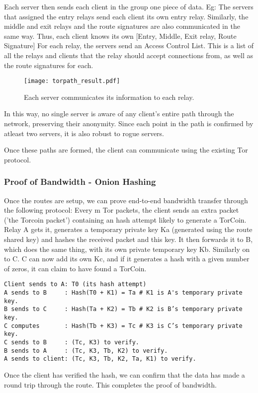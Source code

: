 Each server then sends each client in the group one piece of data. Eg: The servers that assigned the entry relays send each client its own entry relay. Similarly, the middle and exit relays and the route signatures are also communicated in the same way. Thus, each client knows its own [Entry, Middle, Exit relay, Route Signature] 
For each relay, the servers send an Access Control List. This is a list of all the relays and clients that the relay should accept connections from, as well as the route signatures for each.

\begin{figure}
  \centering
    \texttt{[image: torpath\_result.pdf]}
  \caption{Each server communicates its information to each relay.}
\end{figure}

In this way, no single server is aware of any client's entire path through the network, preserving their anonymity. Since each point in the path is confirmed by atleast two servers, it is also robust to rogue servers.

Once these paths are formed, the client can communicate using the existing Tor protocol. 

\subsubsection{Proof of Bandwidth - Onion Hashing}
Once the routes are setup, we can prove end-to-end bandwidth transfer through the following protocol:
Every m Tor packets, the client sends an extra packet ('the Torcoin packet') containing an hash attempt likely to generate a TorCoin. Relay A gets it, generates a temporary private key Ka (generated using the route shared key) and hashes the received packet and this key. It then forwards it to B, which does the same thing, with its own private temporary key Kb. Similarly on to C. C can now add its own Kc, and if it generates a hash with a given number of zeros, it can claim to have found a TorCoin.
\begin{verbatim}
Client sends to A: T0 (its hash attempt)
A sends to B     : Hash(T0 + K1) = Ta # K1 is A's temporary private key.
B sends to C     : Hash(Ta + K2) = Tb # K2 is B’s temporary private key.
C computes       : Hash(Tb + K3) = Tc # K3 is C’s temporary private key.
C sends to B     : (Tc, K3) to verify.
B sends to A     : (Tc, K3, Tb, K2) to verify.
A sends to client: (Tc, K3, Tb, K2, Ta, K1) to verify.
\end{verbatim}
Once the client has verified the hash, we can confirm that the data has made a 
round trip through the route. This completes the proof of bandwidth.

